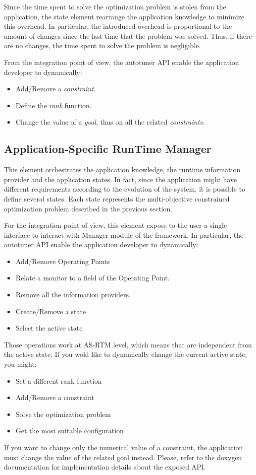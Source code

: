 Since the time spent to solve the optimization problem is stolen from the application, the state element rearrange the application knowledge to minimize this overhead.
In particular, the introduced overhead is proportional to the amount of changes since the last time that the problem was solved.
Thus, if there are no changes, the time spent to solve the problem is negligible.


From the integration point of view, the autotuner API enable the application developer to dynamically:
\begin{itemize}
	\item Add/Remove a \textit{constraint}.
	\item Define the \textit{rank} function.
	\item Change the value of a \textit{goal}, thus on all the related \textit{constraints}.
\end{itemize}





\subsection{Application-Specific RunTime Manager}
	
This element orchestrates the application knowledge, the runtime information provider and the application states.
In fact, since the application might have different requirements according to the evolution of the system, it is possible to define several states.
Each state represents the multi-objective constrained optimization problem described in the previous section.

For the integration point of view, this element expose to the user a single interface to interact with Manager module of the framework.
In particular, the autotuner API enable the application developer to dynamically:
\begin{itemize}
	\item Add/Remove Operating Points
	\item Relate a monitor to a field of the Operating Point.
	\item Remove all the information providers.
	\item Create/Remove a state
	\item Select the active state
\end{itemize}
Those operations work at AS-RTM level, which means that are independent from the active state.
If you wold like to dynamically change the current active state, you might:
\begin{itemize}
	\item Set a different rank function
	\item Add/Remove a constraint
	\item Solve the optimization problem
	\item Get the most suitable configuration
\end{itemize}
If you want to change only the numerical value of a constraint, the application must change the value of the related goal instead.
Please, refer to the doxygen documentation for implementation details about the exposed API.


